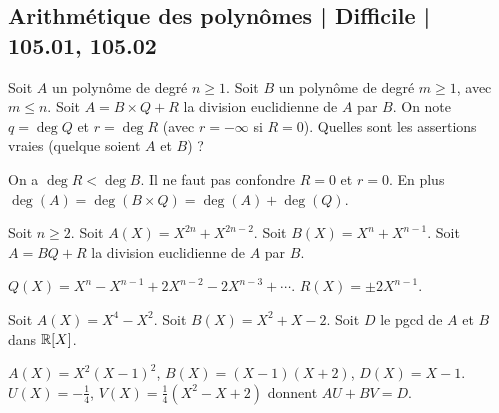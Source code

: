\subsection{Arithmétique des polynômes | Difficile | 105.01, 105.02}

\begin{question}
Soit $A$ un polynôme de degré $n\ge1$. Soit $B$ un polynôme de degré $m\ge1$, avec $m \le n$.
Soit $A = B \times Q + R$ la division euclidienne de $A$ par $B$. On note
$q = \deg Q$ et $r = \deg R$ (avec $r=-\infty$ si $R=0$).
Quelles sont les assertions vraies (quelque soient $A$ et $B$) ?
\begin{answers}



\end{answers}
\begin{explanations}
On a $\deg R < \deg B$. Il ne faut pas confondre $R=0$ et $r=0$.
En plus $\deg(A) = \deg(B\times Q) = \deg(A) + \deg(Q)$.
\end{explanations}
\end{question}


\begin{question}
Soit $n\ge2$. Soit $A(X) = X^{2n}+X^{2n-2}$. Soit $B(X) = X^{n}+X^{n-1}$. Soit $A = BQ + R$ la division euclidienne de $A$ par $B$. 
\begin{answers}



   
\end{answers}
\begin{explanations}
$Q(X) = X^n-X^{n-1}+2X^{n-2}-2X^{n-3}+\cdots$. $R(X) = \pm 2 X^{n-1}$.
\end{explanations}
\end{question}



\begin{question}
Soit $A(X) = X^4-X^2$. Soit $B(X) = X^2+X-2$.
Soit $D$ le pgcd de $A$ et $B$ dans $\mathbb{R}[X]$.
\begin{answers}



\end{answers}
\begin{explanations}
$A(X)=X^2(X-1)^2$, $B(X)=(X-1)(X+2)$, $D(X)=X-1$. $U(X)= -\frac14$, $V(X)=\frac14(X^2-X+2)$ donnent $AU+BV=D$.
\end{explanations}
\end{question}

